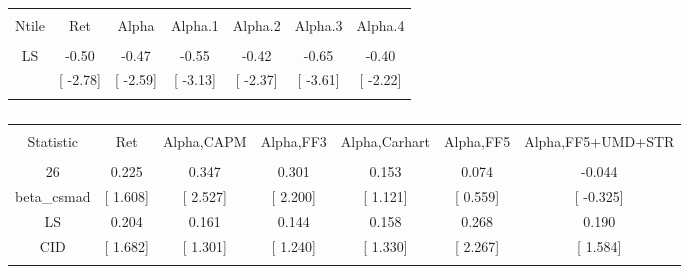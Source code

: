 \documentclass[16pt]{article}
\begin{document}
\begin{table}[!htbp] \centering 
  \caption{} 
  \label{} 
\begin{tabular}{@{\extracolsep{5pt}} ccccccc} 
\\[-1.8ex]\hline 
\hline \\[-1.8ex] 
Ntile & Ret & Alpha & Alpha.1 & Alpha.2 & Alpha.3 & Alpha.4 \\ 
\hline \\[-1.8ex] 
LS & -0.50 & -0.47 & -0.55 & -0.42 & -0.65 & -0.40 \\ 
 & [ -2.78] & [ -2.59] & [ -3.13] & [ -2.37] & [ -3.61] & [ -2.22] \\ 
\hline \\[-1.8ex] 
\end{tabular} 
\end{table}

\begin{table}[!htbp] \centering 
  \caption{} 
  \label{} 
\begin{tabular}{@{\extracolsep{5pt}} ccccccc} 
\\[-1.8ex]\hline 
\hline \\[-1.8ex] 
Statistic & Ret & Alpha,CAPM & Alpha,FF3 & Alpha,Carhart & Alpha,FF5 & Alpha,FF5+UMD+STR \\ 
\hline \\[-1.8ex] 
26 & 0.225 & 0.347 & 0.301 & 0.153 & 0.074 & -0.044 \\ 
beta\_csmad & [ 1.608] & [ 2.527] & [ 2.200] & [ 1.121] & [ 0.559] & [ -0.325] \\ 
LS & 0.204 & 0.161 & 0.144 & 0.158 & 0.268 & 0.190 \\ 
CID & [ 1.682] & [ 1.301] & [ 1.240] & [ 1.330] & [ 2.267] & [ 1.584] \\ 
\hline \\[-1.8ex] 
\end{tabular} 
\end{table}
\end{document}
